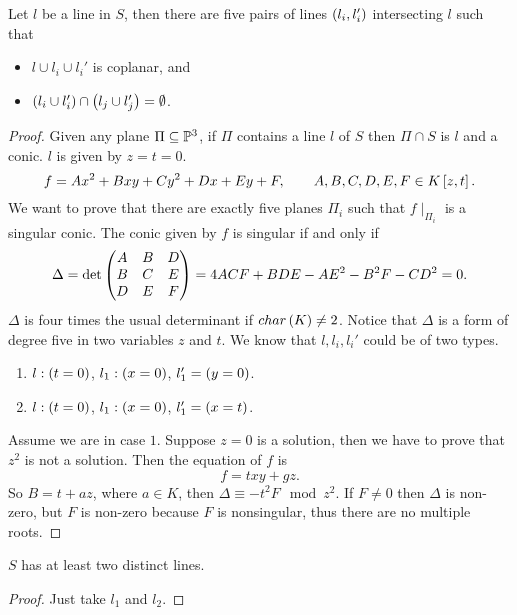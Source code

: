 \pagebreak


\begin{proposition}
Let $ l $ be a line in $ S $, then there are five pairs of lines $ \rb{l_i, l_i'} $ intersecting $ l $ such that
\begin{itemize}
\item $ l \cup l_i \cup l_i' $ is coplanar, and
\item $ \rb{l_i \cup l_i'} \cap \rb{l_j \cup l_j'} = \emptyset $.
\end{itemize}
\end{proposition}

\begin{proof}
Given any plane $ \Pi \subseteq \P^3 $, if $ \Pi $ contains a line $ l $ of $ S $ then $ \Pi \cap S $ is $ l $ and a conic. $ l $ is given by $ z = t = 0 $.
$$ f = Ax^2 + Bxy + Cy^2 + Dx + Ey + F, \qquad A, B, C, D, E, F \in K\sb{z, t}. $$
We want to prove that there are exactly five planes $ \Pi_i $ such that $ f \mid_{\Pi_i} $ is a singular conic. The conic given by $ f $ is singular if and only if
$$ \Delta = \det\threebythree{A}{B}{D}{B}{C}{E}{D}{E}{F} = 4ACF + BDE - AE^2 - B^2F - CD^2 = 0. $$
$ \Delta $ is four times the usual determinant if $ char\rb{K} \ne 2 $. Notice that $ \Delta $ is a form of degree five in two variables $ z $ and $ t $. We know that $ l, l_i, l_i' $ could be of two types.
\begin{enumerate}
\item $ l : \rb{t = 0} $, $ l_1 : \rb{x = 0} $, $ l_1' = \rb{y = 0} $.
\item $ l : \rb{t = 0} $, $ l_1 : \rb{x = 0} $, $ l_1' = \rb{x = t} $.
\end{enumerate}
Assume we are in case $ 1 $. Suppose $ z = 0 $ is a solution, then we have to prove that $ z^2 $ is not a solution. Then the equation of $ f $ is
$$ f = txy + gz. $$
So $ B = t + az $, where $ a \in K $, then $ \Delta \equiv -t^2F \mod z^2 $. If $ F \ne 0 $ then $ \Delta $ is non-zero, but $ F $ is non-zero because $ F $ is nonsingular, thus there are no multiple roots.
\end{proof}

\begin{corollary}
$ S $ has at least two distinct lines.
\end{corollary}

\begin{proof}
Just take $ l_1 $ and $ l_2 $.
\end{proof}

